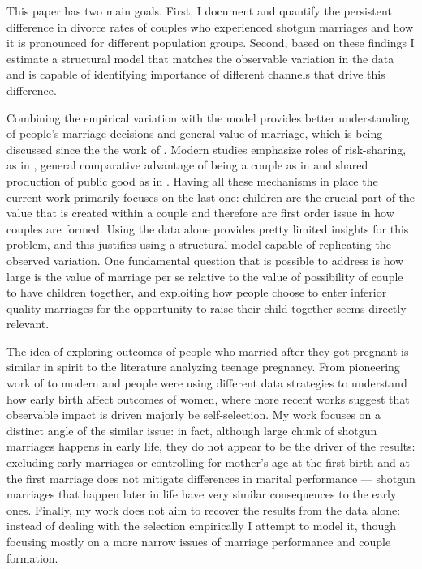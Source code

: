 \documentclass[12pt,letter]{article}
\begin{document}
This paper has two main goals. First, I document and quantify the persistent difference in divorce rates of couples who experienced shotgun marriages and how it is pronounced for different population groups. Second, based on these findings I estimate a structural model that matches the observable variation in the data and is capable of identifying importance of different channels that drive this difference. 

Combining the empirical variation with the model provides better understanding of people's marriage decisions and general value of marriage, which is being discussed since the the work of \cite{becker1981}. Modern studies emphasize roles of risk-sharing, as in \cite{liseyamada}, general comparative advantage of being a couple as in \cite{chiappori1997} and shared production of public good as in \cite{greenwood}. Having all these mechanisms in place the current work primarily focuses on the last one: children are the crucial part of the value that is created within a couple and therefore are first order issue in how couples are formed. Using the data alone provides pretty limited insights for this problem, and this justifies using a structural model capable of replicating the observed variation. One fundamental question that is possible to address is how large is the value of marriage per se relative to the value of possibility of couple to have children together, and exploiting how people choose to enter inferior quality marriages for the opportunity to raise their child together seems directly relevant.

The idea of exploring outcomes of people who married after they got pregnant is similar in spirit to the literature analyzing teenage pregnancy. From pioneering work of \cite{cardwise} to modern \cite{ashcraft} and \cite{rosenbaum} people were using different data strategies to understand how early birth affect outcomes of women, where more recent works suggest that observable impact is driven majorly be self-selection. My work focuses on a distinct angle of the similar issue: in fact, although large chunk of shotgun marriages happens in early life, they do not appear to be the driver of the results: excluding early marriages or controlling for mother's age at the first birth and at the first marriage does not mitigate differences in marital performance --- shotgun marriages that happen later in life have very similar consequences to the early ones. Finally, my work does not aim to recover the results from the data alone: instead of dealing with the selection empirically I attempt to model it, though focusing mostly on a more narrow issues of marriage performance and couple formation.
\end{document}
